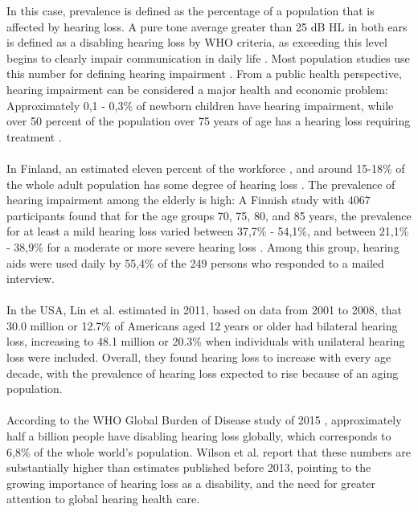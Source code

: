 \documentclass[english, 12pt, a4paper, pdftex, elec, utf8]{aaltothesis}
\begin{document}
In this case, prevalence is defined as the percentage of a population that is affected by hearing loss. A pure tone average greater than 25 dB HL in both ears is defined as a disabling hearing loss by WHO criteria, as exceeding this level begins to clearly impair communication in daily life \cite{salonen2013hearing}. Most population studies use this number for defining hearing impairment \cite{salonen2013hearing, lin2011hearing}. From a public health perspective,  hearing impairment can be considered a major health and economic problem: Approximately 0,1 - 0,3\% of newborn children have hearing impairment, while over 50 percent of the population over 75 years of age has a hearing loss requiring treatment \cite{salonen2013hearing}.  \\\\
In Finland, an estimated eleven percent of the workforce \cite{koskela2013kuulokojeen}, and around 15-18\% of the whole adult population has some degree of hearing loss \cite{salonen2013hearing}. The prevalence of hearing impairment among the elderly is high: A Finnish study with 4067 participants found that for the age groups 70, 75, 80, and 85 years, the prevalence for at least a mild hearing loss varied between 37,7\% - 54,1\%, and between 21,1\% - 38,9\% for a moderate or more severe hearing loss \cite{salonen2013hearing}. Among this group, hearing aids were used daily by 55,4\% of the 249 persons who responded to a mailed interview. \\\\
In the USA, Lin et al. \cite{lin2011hearing} estimated in 2011, based on data from 2001 to 2008, that 30.0 million or 12.7\% of Americans aged 12 years or older had bilateral hearing loss, increasing to 48.1 million or 20.3\% when individuals with unilateral hearing loss were included. Overall, they found hearing loss to increase with every age decade, with the prevalence of hearing loss expected to rise because of an aging population. \\\\
According to the WHO Global Burden of Disease study of 2015 \cite{wilson2017global}, approximately half a billion people have disabling hearing loss globally, which corresponds to 6,8\% of the whole world's population. Wilson et al. \cite{wilson2017global} report that these numbers are substantially higher than estimates published before 2013, pointing to the growing importance of hearing loss as a disability, and the need for greater attention to global hearing health care.
\end{document}

